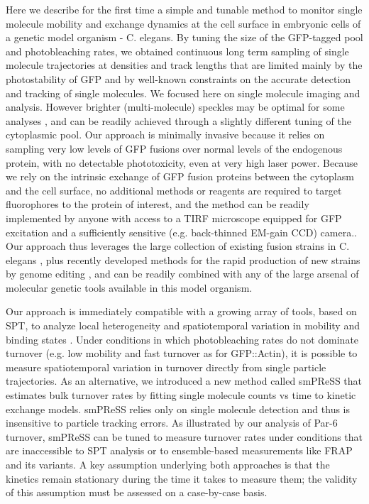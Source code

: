  Here we describe for the first time a simple and tunable method to monitor single molecule mobility and exchange dynamics at the cell surface in embryonic cells of a genetic model organism - C. elegans. By tuning the size of the GFP-tagged pool and photobleaching rates, we obtained continuous long term sampling of single molecule trajectories at densities and track lengths that are limited mainly by the photostability of GFP and by well-known constraints on the accurate detection and tracking of single molecules. We focused here on single molecule imaging and analysis. However brighter (multi-molecule) speckles may be optimal for some analyses \cite{nmeth35}, and can be readily achieved through a slightly different tuning of the cytoplasmic pool. Our approach is minimally invasive because it relies on sampling very low levels of GFP fusions over normal levels of the endogenous protein, with no detectable phototoxicity, even at very high laser power. Because we rely on the intrinsic exchange of GFP fusion proteins between the cytoplasm and the cell surface, no additional methods or reagents are required to target fluorophores to the protein of interest, and the method can be readily implemented by anyone with access to a TIRF microscope equipped for GFP excitation and a sufficiently sensitive (e.g. back-thinned EM-gain CCD) camera.. Our approach thus leverages the large collection of existing fusion strains in C. elegans \cite{nmeth17}, plus recently developed methods for the rapid production of new strains by genome editing \cite{nmeth36}, and can be readily combined with any of the large arsenal of molecular genetic tools available in this model organism.
 
 
 Our approach is immediately compatible with a growing array of tools, based on SPT, to analyze local heterogeneity and spatiotemporal variation in mobility and binding states \cite{nmeth28,nmeth29}. Under conditions in which photobleaching rates do not dominate turnover (e.g. low mobility and fast turnover as for GFP::Actin), it is possible to measure spatiotemporal variation in turnover directly from single particle trajectories. As an alternative, we introduced a new method called smPReSS that estimates bulk turnover rates by fitting single molecule counts vs time to kinetic exchange models. smPReSS relies only on single molecule detection and thus is insensitive to particle tracking errors. As illustrated by our analysis of Par-6 turnover, smPReSS can be tuned to measure turnover rates under conditions that are inaccessible to SPT analysis or to ensemble-based measurements like FRAP and its variants. A key assumption underlying both approaches is that the kinetics remain stationary during the time it takes to measure them; the validity of this assumption must be assessed on a case-by-case basis.
 
